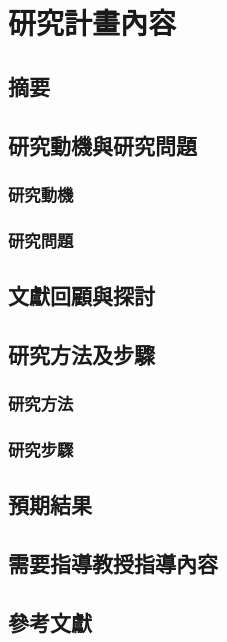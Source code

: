\chapter{研究計畫內容}

\section{摘要}

\section{研究動機與研究問題}

\subsection{研究動機}

\subsection{研究問題}

\section{文獻回顧與探討}

\section{研究方法及步驟}

\subsection{研究方法}

\subsection{研究步驟}

\section{預期結果}

\section{需要指導教授指導內容}

\section{參考文獻}


